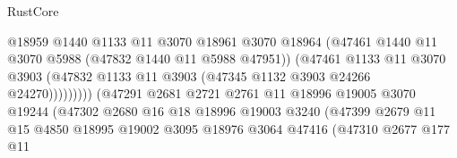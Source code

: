 \begin{lexlean}{RustCore}
\begin{coremodule}
                                            @18959
                                            @1440
                                            @1133
                                            @11
                                            @3070
                                            @18961
                                            @3070
                                            @18964
                                            (@47461
                                              @1440
                                              @11
                                              @3070
                                              @5988
                                              (@47832 @1440 @11 @5988 @47951))
                                            (@47461
                                              @1133
                                              @11
                                              @3070
                                              @3903
                                              (@47832
                                                @1133
                                                @11
                                                @3903
                                                (@47345 @1132 @3903 @24266 @24270)))))))))
                                (@47291
                                  @2681
                                  @2721
                                  @2761
                                  @11
                                  @18996
                                  @19005
                                  @3070
                                  @19244
                                  (@47302
                                    @2680
                                    @16
                                    @18
                                    @18996
                                    @19003
                                    @3240
                                    (@47399
                                      @2679
                                      @11
                                      @15
                                      @4850
                                      @18995
                                      @19002
                                      @3095
                                      @18976
                                      @3064
                                      @47416
                                      (@47310
                                        @2677
                                        @177
                                        @11

\end{coremodule}
\end{lexlean}
